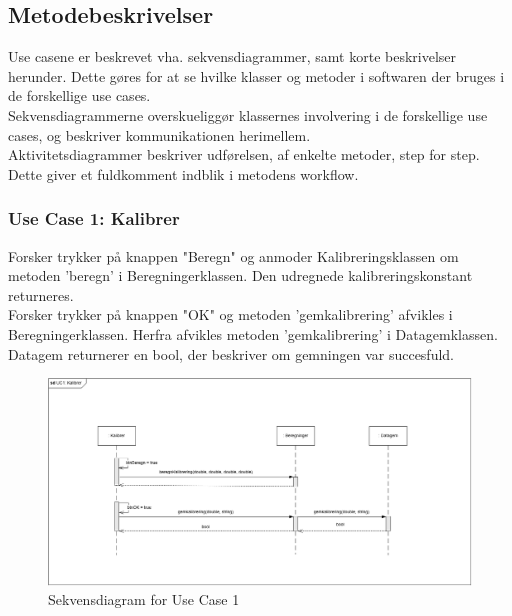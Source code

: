 \subsection{Metodebeskrivelser}

Use casene er beskrevet vha. sekvensdiagrammer, samt korte beskrivelser herunder. Dette gøres for at se hvilke klasser og metoder i softwaren der bruges i de forskellige use cases.\\
Sekvensdiagrammerne overskueliggør klassernes involvering i de forskellige use cases, og beskriver kommunikationen herimellem.\\
Aktivitetsdiagrammer beskriver udførelsen, af enkelte metoder, step for step. Dette giver et fuldkomment indblik i metodens workflow.


\subsubsection{Use Case 1: Kalibrer}
Forsker trykker på knappen "Beregn" og anmoder Kalibreringsklassen om metoden 'beregn' i Beregningerklassen. Den udregnede kalibreringskonstant returneres.\\
Forsker trykker på knappen "OK" og metoden 'gemkalibrering' afvikles i Beregningerklassen. Herfra afvikles metoden 'gemkalibrering' i Datagemklassen. Datagem returnerer en bool, der beskriver om gemningen var succesfuld.
\begin{figure}[H]
	\centering
	\includegraphics[width=1\textwidth]{Figurer/UC1_SD_SW}
	\caption{Sekvensdiagram for Use Case 1}
\end{figure}

